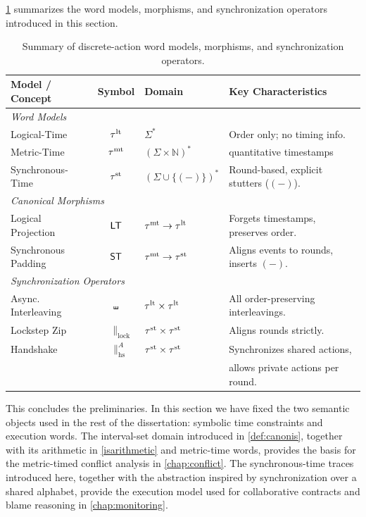  \ref{tab:word-models-summary} summarizes the word models, morphisms, and synchronization operators introduced in this section.
\begin{table}[h!]
  \centering
  \caption{Summary of discrete-action word models, morphisms, and synchronization operators.}
  \label{tab:word-models-summary}
  \renewcommand{\arraystretch}{1.3}
  \begin{tabular}{@{}l c l l@{}}
  \toprule
  \textbf{Model / Concept} & \textbf{Symbol} & \textbf{Domain} & \textbf{Key Characteristics} \\
  \midrule
  \multicolumn{4}{l}{\textit{Word Models}} \\
  Logical-Time & $\tau^{\mathrm{lt}}$ & $\Sigma^*$ & Order only; no timing info. \\
  Metric-Time & $\tau^{\mathrm{mt}}$ & $(\Sigma \times \mathbb{N})^*$ & quantitative timestamps \\
  Synchronous-Time & $\tau^{\mathrm{st}}$ & $(\Sigma \cup \{(-)\})^*$ & Round-based, explicit stutters ($(-)$). \\
  \midrule
  \multicolumn{4}{l}{\textit{Canonical Morphisms}} \\
  Logical Projection & $\mathsf{LT}$ & $\tau^{\mathrm{mt}} \to \tau^{\mathrm{lt}}$ & Forgets timestamps, preserves order. \\
  Synchronous Padding & $\mathsf{ST}$ & $\tau^{\mathrm{mt}} \to \tau^{\mathrm{st}}$ & Aligns events to rounds, inserts $(-)$. \\
  \midrule
  \multicolumn{4}{l}{\textit{Synchronization Operators}} \\
  Async. Interleaving & $\shuffle$ & $\tau^{\mathrm{lt}} \times \tau^{\mathrm{lt}}$ & All order-preserving interleavings. \\
  Lockstep Zip & $~~~~~\parallel_{\mathrm{lock}}$ & $\tau^{\mathrm{st}} \times \tau^{\mathrm{st}}$ & Aligns rounds strictly. \\
  Handshake & $~~~\parallel_{\mathrm{hs}}^{A}$ & $\tau^{\mathrm{st}} \times \tau^{\mathrm{st}}$ & Synchronizes shared actions,\\
  & & & allows private actions per round. \\
  \bottomrule
  \end{tabular}
  \end{table}

  This concludes the preliminaries. In this section we have fixed the two semantic objects used in the rest of the dissertation: symbolic time constraints and execution words. The interval-set domain introduced in \ref{def:canonis}, together with its arithmetic in \ref{isarithmetic} and metric-time words, provides the basis for the metric-timed conflict analysis in \ref{chap:conflict}. The synchronous-time traces introduced here, together with the abstraction inspired by synchronization over a shared alphabet, provide the execution model used for collaborative contracts and blame reasoning in \ref{chap:monitoring}. 

  
